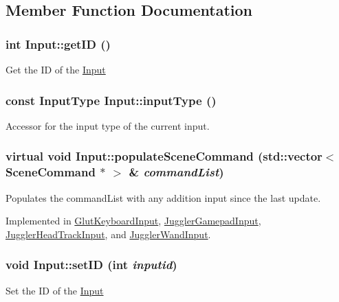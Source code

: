 \subsection{Member Function Documentation}
\hypertarget{class_input_a64afe40706be8b09168100a7aeee26e2}{
\subsubsection[{getID}]{\setlength{\rightskip}{0pt plus 5cm}int Input::getID ()}}
\label{class_input_a64afe40706be8b09168100a7aeee26e2}
Get the ID of the \hyperlink{class_input}{Input} \hypertarget{class_input_a50aabbed0136edcf6c3eae963e2d9a55}{
\subsubsection[{inputType}]{\setlength{\rightskip}{0pt plus 5cm}const {\bf InputType} Input::inputType ()}}
\label{class_input_a50aabbed0136edcf6c3eae963e2d9a55}
Accessor for the input type of the current input. \hypertarget{class_input_ab927e3b2f1735052f6f1ef3f3bf7b29c}{
\subsubsection[{populateSceneCommand}]{\setlength{\rightskip}{0pt plus 5cm}virtual void Input::populateSceneCommand (std::vector$<$ {\bf SceneCommand} $\ast$ $>$ \& {\em commandList})}}
\label{class_input_ab927e3b2f1735052f6f1ef3f3bf7b29c}
Populates the commandList with any addition input since the last update. 

Implemented in \hyperlink{class_glut_keyboard_input_a820e8803532b4fa2257a44c4ece6701a}{GlutKeyboardInput}, \hyperlink{class_juggler_gamepad_input_aa2ead837a9d4ba9d94701e675b6d61d4}{JugglerGamepadInput}, \hyperlink{class_juggler_head_track_input_abb40712fe1e84f4172e883645bd0f1b8}{JugglerHeadTrackInput}, and \hyperlink{class_juggler_wand_input_a189d0680740c8755abc38b841de34130}{JugglerWandInput}.\hypertarget{class_input_aa1402943d600a2a5d9238204803c0eda}{
\subsubsection[{setID}]{\setlength{\rightskip}{0pt plus 5cm}void Input::setID (int {\em inputid})}}
\label{class_input_aa1402943d600a2a5d9238204803c0eda}
Set the ID of the \hyperlink{class_input}{Input} 

